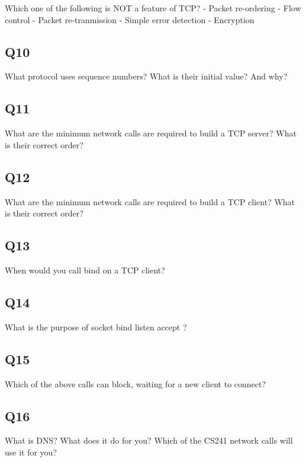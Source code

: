 Which one of the following is NOT a feature of TCP? - Packet re-ordering - Flow control - Packet re-tranmission - Simple error detection - Encryption

\subsection{Q10}\label{q10}

What protocol uses sequence numbers? What is their initial value? And why?

\subsection{Q11}\label{q11}

What are the minimum network calls are required to build a TCP server? What is their correct order?

\subsection{Q12}\label{q12}

What are the minimum network calls are required to build a TCP client? What is their correct order?

\subsection{Q13}\label{q13}

When would you call bind on a TCP client?

\subsection{Q14}\label{q14}

What is the purpose of socket bind listen accept ?

\subsection{Q15}\label{q15}

Which of the above calls can block, waiting for a new client to connect?

\subsection{Q16}\label{q16}

What is DNS? What does it do for you? Which of the CS241 network calls will use it for you?

